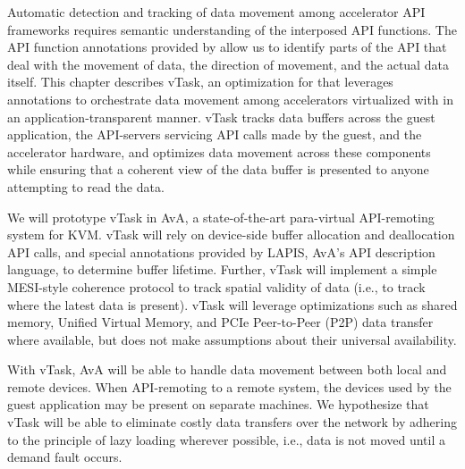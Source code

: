 Automatic detection and tracking of data movement among accelerator API
frameworks requires semantic understanding of the interposed API functions.
The API function annotations provided by \lapis allow us to identify parts of
the API that deal with the movement of data, the direction of movement, and the
actual data itself. This chapter describes vTask, an optimization for \AvA that
leverages \lapis annotations to orchestrate data movement among accelerators
virtualized with \hira in an application-transparent manner. vTask tracks data
buffers across the guest application, the API-servers servicing API calls made
by the guest, and the accelerator hardware, and optimizes data movement across
these components while ensuring that a coherent view of the data buffer is
presented to anyone attempting to read the data.

We will prototype vTask in AvA, a state-of-the-art para-virtual API-remoting
system for KVM. vTask will rely on device-side buffer allocation and
deallocation API calls, and special annotations provided by LAPIS, AvA’s API
description language, to determine buffer lifetime. Further, vTask will
implement a simple MESI-style coherence protocol to track spatial validity of
data (i.e., to track where the latest data is present). vTask will leverage
optimizations such as shared memory, Unified Virtual Memory, and PCIe
Peer-to-Peer (P2P) data transfer where available, but does not make
assumptions about their universal availability.

With vTask, AvA will be able to handle data movement between both local and
remote devices. When API-remoting to a remote system, the devices used by the
guest application may be present on separate machines. We hypothesize that
vTask will be able to eliminate costly data transfers over the network by
adhering to the principle of lazy loading wherever possible, i.e., data is not
moved until a demand fault occurs.
